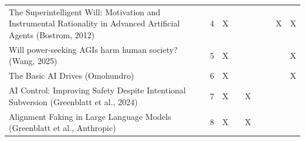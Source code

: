 \begin{landscape}
\begin{longtable}{|p{17cm}|c|c|c|c|c|c|c|c|}
		The Superintelligent Will: Motivation and Instrumental Rationality in Advanced Artificial Agents (Bostrom, 2012) & 4           & X                                  &                                                           &                                                       &                                                            &                                           & X                                            & X                                                  \\
		Will power-seeking AGIs harm human society? (Wang, 2025)                                                         & 5           & X                                  &                                                           &                                                       &                                                            &                                           &                                              & X                                                  \\
		The Basic AI Drives (Omohundro)                                                                                  & 6           & X                                  &                                                           &                                                       &                                                            &                                           &                                              & X                                                  \\
		AI Control: Improving Safety Despite Intentional Subversion (Greenblatt et al., 2024)                            & 7           & X                                  &                                                           & X                                                     &                                                            &                                           &                                              &                                                    \\
		Alignment Faking in Large Language Models (Greenblatt et al., Anthropic)                                         & 8           & X                                  &                                                           & X                                                     &                                                            &                                           &                                              &                                                    \\

\end{longtable}
\end{landscape}
